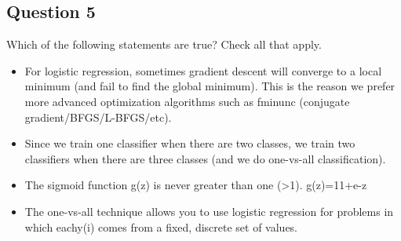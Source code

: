 \subsection{Question 5}
Which of the following statements are true? Check all that apply.

\begin{itemize}
\item For logistic regression, sometimes gradient descent will converge to a local minimum (and fail to find the global minimum). This is the reason we prefer more advanced optimization algorithms such as fminunc (conjugate gradient/BFGS/L-BFGS/etc).

\item Since we train one classifier when there are two classes, we train two classifiers when there are three classes (and we do one-vs-all classification).

\item The sigmoid function g(z) is never greater than one (>1). g(z)=11+e-z

\item 
The one-vs-all technique allows you to use logistic regression for problems in which eachy(i) comes from a fixed, discrete set of values.
\end{itemize}






